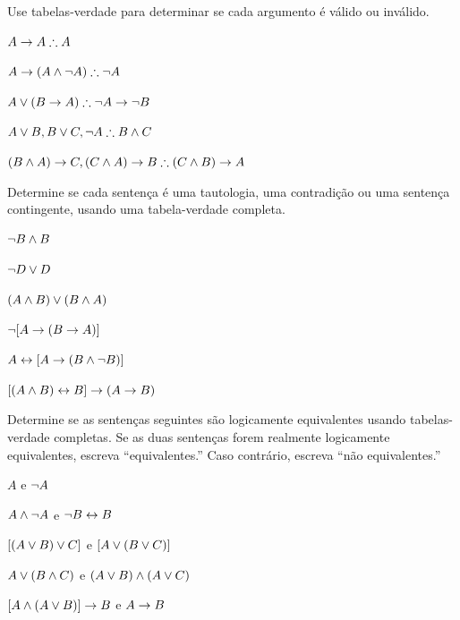 \solutions
\problempart
\label{pr.TT.valid}
Use tabelas-verdade para determinar se cada argumento é válido ou inválido.
\begin{compactlist}
\item $A\eif A \therefore A$ %
\item $A\eif(A\eand\enot A) \therefore \enot A$ %
\item $A\eor(B\eif A) \therefore \enot A \eif \enot B$ %
\item $A\eor B, B\eor C, \enot A \therefore B \eand C$ %
\item $(B\eand A)\eif C, (C\eand A)\eif B \therefore (C\eand B)\eif A$ %
\end{compactlist}

\problempart Determine se cada sentença é uma tautologia, uma contradição ou uma sentença contingente, usando uma tabela-verdade completa.
\begin{compactlist}
\item $\neg B \wedge B$ \vspace{.5ex}%


\item $\neg D \vee D$ \vspace{.5ex}%


\item $(A\wedge B) \vee (B\wedge A)$\vspace{.5ex} %


\item $\neg[A \rightarrow (B \rightarrow A)]$\vspace{.5ex} %


\item $A \leftrightarrow [A \rightarrow (B \wedge \neg B)]$ \vspace{.5ex}%


\item $[(A \wedge B) \leftrightarrow B] \rightarrow (A \rightarrow B)$ \vspace{.5ex}%

\end{compactlist}



\noindent\problempart
\label{pr.TT.equiv}
Determine se as sentenças seguintes são logicamente equivalentes usando tabelas-verdade completas. Se as duas sentenças forem realmente logicamente equivalentes, escreva ``equivalentes.'' Caso contrário, escreva ``não equivalentes.'' 
\begin{compactlist}
\item $A$ e $\neg A$
\item $A \wedge \neg A$ e $\neg B \leftrightarrow B$
\item $[(A \vee B) \vee C]$ e $[A \vee (B \vee C)]$
\item $A \vee (B \wedge C)$ e $(A \vee B) \wedge (A \vee C)$
\item $[A \wedge (A \vee B)] \rightarrow B$ e $A \rightarrow B$\end{compactlist}


